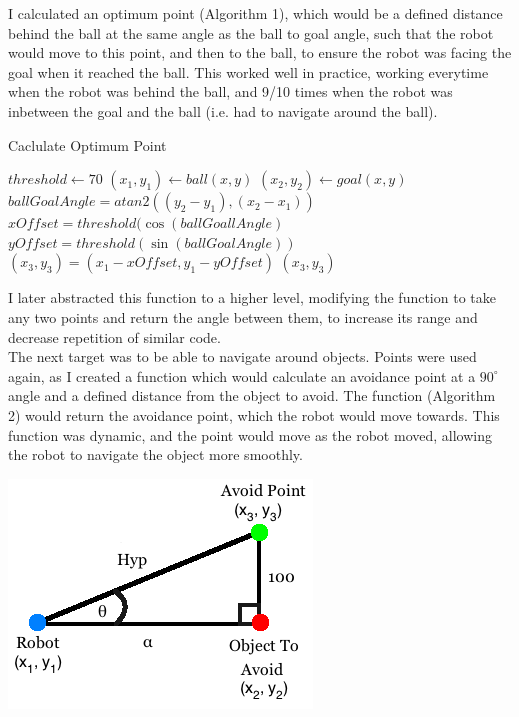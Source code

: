 \documentclass[12pt]{IEEEtran}
\begin{document}
I calculated an optimum point (Algorithm 1), which would be a defined distance behind the ball at the same angle as the ball to goal angle, such that the robot would move to this point, and then to the ball, to ensure the robot was facing the goal when it reached the ball. This worked well in practice, working everytime when the robot was behind the ball, and 9/10 times when the robot was inbetween the goal and the ball (i.e. had to navigate around the ball).


\begin{algorithm}
\caption{Caclulate Optimum Point}
\begin{algorithmic}[1]
\STATE $threshold \gets 70$
\STATE $(x_{1}, y_{1}) \gets ball (x, y)$
\STATE $(x_{2}, y_{2}) \gets goal (x, y)$
\STATE $ballGoalAngle = atan2( (y_{2} - y_{1}), (x_{2} - x_{1}) )$
\STATE $xOffset = threshold(\cos(ballGoallAngle)$
\STATE $yOffset = threshold(\sin(ballGoalAngle))$
\STATE $(x_{3}, y_{3}) = (x_{1} - xOffset, y_{1} - yOffset)$
\RETURN $(x_{3}, y_{3})$
\end{algorithmic}
\end{algorithm}

I later abstracted this function to a higher level, modifying the function to take any two points and return the angle between them, to increase its range and decrease repetition of similar code. \\

The next target was to be able to navigate around objects. Points were used again, as I created a function which would calculate an avoidance point at a $90^{\circ}$ angle and a defined distance from the object to avoid. The function (Algorithm 2) would return the avoidance point, which the robot would move towards. 
This function was dynamic, and the point would move as the robot moved, allowing the robot to navigate the object more smoothly.\\

\begin{center}
\includegraphics[scale=0.6]{AvoidPoints.png}\\
\end{center}
\end{document}
